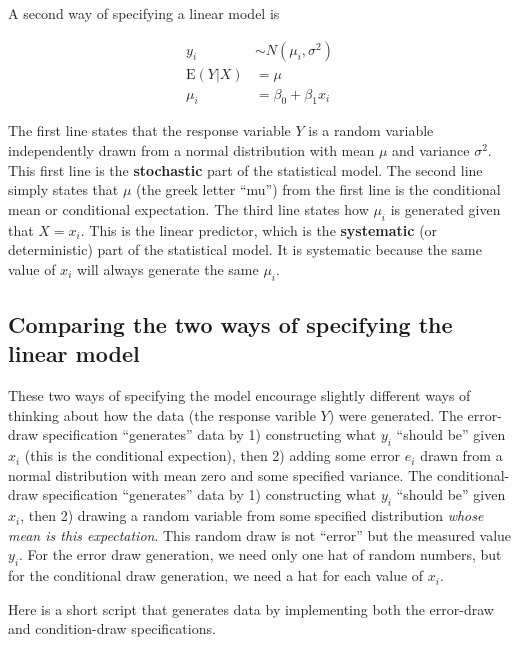\documentclass[]{book}
\begin{document}
A second way of specifying a linear model is

\begin{align}
y_i &\sim N(\mu_i, \sigma^2)\\
\mathrm{E}(Y|X) &= \mu\\
\mu_i &= \beta_0 + \beta_1 x_i
\label{eq:lm-spec2}
\end{align}

The first line states that the response variable \(Y\) is a random variable independently drawn from a normal distribution with mean \(\mu\) and variance \(\sigma^2\). This first line is the \textbf{stochastic} part of the statistical model. The second line simply states that \(\mu\) (the greek letter ``mu'') from the first line is the conditional mean or conditional expectation. The third line states how \(\mu_i\) is generated given that \(X=x_i\). This is the linear predictor, which is the \textbf{systematic} (or deterministic) part of the statistical model. It is systematic because the same value of \(x_i\) will always generate the same \(\mu_i\).

\hypertarget{comparing-the-two-ways-of-specifying-the-linear-model}{%
\subsection{Comparing the two ways of specifying the linear model}\label{comparing-the-two-ways-of-specifying-the-linear-model}}

These two ways of specifying the model encourage slightly different ways of thinking about how the data (the response varible \(Y\)) were generated. The error-draw specification ``generates'' data by 1) constructing what \(y_i\) ``should be'' given \(x_i\) (this is the conditional expection), then 2) adding some error \(e_i\) drawn from a normal distribution with mean zero and some specified variance. The conditional-draw specification ``generates'' data by 1) constructing what \(y_i\) ``should be'' given \(x_i\), then 2) drawing a random variable from some specified distribution \emph{whose mean is this expectation}. This random draw is not ``error'' but the measured value \(y_i\). For the error draw generation, we need only one hat of random numbers, but for the conditional draw generation, we need a hat for each value of \(x_i\).

Here is a short script that generates data by implementing both the error-draw and condition-draw specifications.
\end{document}
